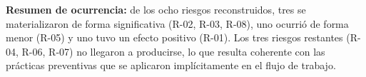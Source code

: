 \textbf{Resumen de ocurrencia:} de los ocho riesgos reconstruidos,
tres se materializaron de forma significativa (R-02, R-03, R-08), uno
ocurrió de forma menor (R-05) y uno tuvo un efecto positivo (R-01).
Los tres riesgos restantes (R-04, R-06, R-07) no llegaron a producirse,
lo que resulta coherente con las prácticas preventivas que se aplicaron
implícitamente en el flujo de trabajo.


